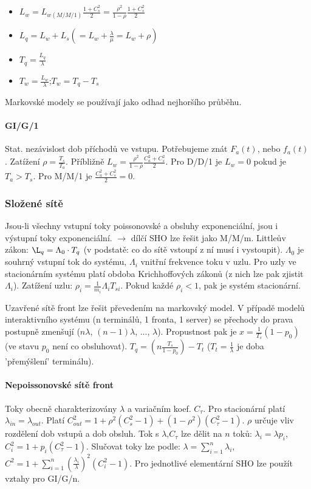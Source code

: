 \documentclass[11pt,a4paper]{scrartcl}
\begin{document}
	\begin{itemize}
		\item $L_w = L_{w(M/M/1)}\frac{1+C_s^2}{2}=\frac{\rho^2}{1-\rho}\frac{1+C_s^2}{2}$
		
		\item $L_q = L_w + L_s (=L_w + \frac{\lambda}{\mu} = L_w + \rho)$
		
		\item $T_q = \frac{L_q}{\lambda}$
		
		\item $T_w = \frac{L_w}{\lambda}$;$T_w = T_q - T_s$
	\end{itemize}
	Markovské modely se používají jako odhad nejhoršího průběhu.
	
	\paragraph{GI/G/1} Stat. nezávislost dob příchodů ve vstupu. Potřebujeme znát $F_a(t)$, nebo $f_a(t)$. Zatížení $\rho = \frac{T_s}{T_a}$. Příbližně $L_w=\frac{\rho^2}{1-\rho}\frac{C_a^2+C_s^2}{2}$. Pro D/D/1 je $L_w=0$ pokud je $T_a > T_s$. Pro M/M/1 je $\frac{C_a^2+C_s^2}{2} = 0$.
	
	
	\subsubsection{Složené sítě}
	Jsou-li všechny vstupní toky poissonovské a obsluhy exponenciální, jsou i výstupní toky exponenciální. $\rightarrow$ dílčí SHO lze řešit jako M/M/m. Littleův zákon: $\L_q = \Lambda_0\cdot T_q$ (v podstatě: co do sítě vstoupí z ní musí i vystoupit). $\Lambda_0$ je souhrný vstupní tok do systému, $\Lambda_i$ vnitřní frekvence toku v uzlu. Pro uzly ve stacionárním systému platí obdoba Krichhoffových zákonů (z nich lze pak zjistit $\Lambda_i$). Zatížení uzlu: $\rho_i = \frac{1}{m_i}\Lambda_i T_{si}$. Pokud každé $\rho_i < 1$, pak je systém stacionární.
	
	Uzavřené sítě front lze řešit převedením na markovský model. V případě modelů interaktivního systému (n terminálů, 1 fronta, 1 server) se přechody do prava postupně zmenšují ($n\lambda$, $(n-1)\lambda$, ..., $\lambda$). Propustnost pak je $x=\frac{1}{T_s}(1-p_0)$ (ve stavu $p_0$ není co obsluhovat). $T_q=(n\frac{T_s}{1-p_0}) - T_t$ ($T_t = \frac{1}{\lambda}$ je doba 'přemýšlení' terminálu). 
	
	\paragraph{Nepoissonovské sítě front} Toky obecně charakterizovány $\lambda$ a variačním koef. $C_\tau$. Pro stacionární platí $\lambda_{in} = \lambda_{out}$. Platí $C_{out}^2=1+\rho^2(C_s^2-1)+(1-\rho^2)(C_\tau^2-1)$. $\rho$ určuje vliv rozdělení dob vstupů a dob obsluh. Tok s $\lambda$,$C_\tau$ lze dělit na $n$ toků: $\lambda_i = \lambda p_i$, $C_i^2 = 1 + p_i(C_\tau^2-1)$. Slučovat toky lze podle: $\lambda = \sum_{i=1}^{n}\lambda_i$,$C^2 = 1+\sum_{i=1}^n(\frac{\lambda_i}{\lambda})^2(C_i^2 - 1)$. Pro jednotlivé elementární SHO lze použít vztahy pro GI/G/n.
	
\end{document}
